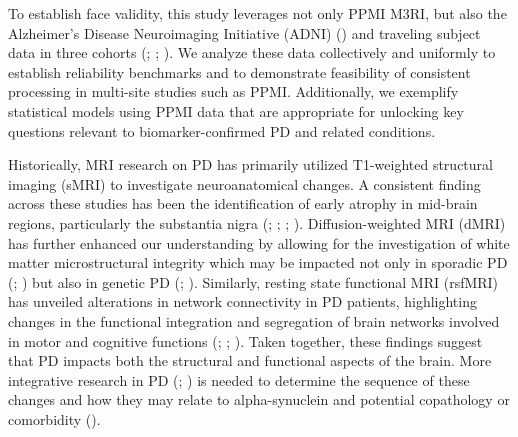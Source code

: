 \documentclass[
  table]{article}
\begin{document}
To establish face validity, this study leverages not only PPMI M3RI, but
also the Alzheimer's Disease Neuroimaging Initiative (ADNI)
() and traveling
subject data in three cohorts
(;
;
). We analyze
these data collectively and uniformly to establish reliability
benchmarks and to demonstrate feasibility of consistent processing in
multi-site studies such as PPMI. Additionally, we exemplify statistical
models using PPMI data that are appropriate for unlocking key questions
relevant to biomarker-confirmed PD and related conditions.

Historically, MRI research on PD has primarily utilized T1-weighted
structural imaging (sMRI) to investigate neuroanatomical changes. A
consistent finding across these studies has been the identification of
early atrophy in mid-brain regions, particularly the substantia nigra
(;
;
;
).
Diffusion-weighted MRI (dMRI) has further enhanced our understanding by
allowing for the investigation of white matter microstructural integrity
which may be impacted not only in sporadic PD
(;
)
but also in genetic PD (; ). Similarly, resting state functional MRI (rsfMRI) has unveiled
alterations in network connectivity in PD patients, highlighting changes
in the functional integration and segregation of brain networks involved
in motor and cognitive functions
(;
;
).
Taken together, these findings suggest that PD impacts both the
structural and functional aspects of the brain. More integrative
research in PD (;
) is needed
to determine the sequence of these changes and how they may relate to
alpha-synuclein and potential copathology or comorbidity
().
\end{document}
